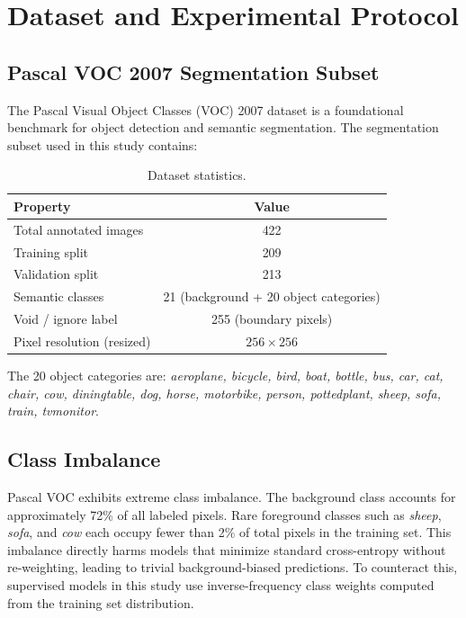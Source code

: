 \documentclass[11pt,a4paper]{article}
\begin{document}
\section{Dataset and Experimental Protocol}

\subsection{Pascal VOC 2007 Segmentation Subset}

The Pascal Visual Object Classes (VOC) 2007 dataset is a foundational benchmark for object detection and semantic segmentation. The segmentation subset used in this study contains:

\begin{table}[H]
\centering
\caption{Dataset statistics.}
\begin{tabular}{lc}
\toprule
Property & Value \\
\midrule
Total annotated images & 422 \\
Training split & 209 \\
Validation split & 213 \\
Semantic classes & 21 (background + 20 object categories) \\
Void / ignore label & 255 (boundary pixels) \\
Pixel resolution (resized) & $256 \times 256$ \\
\bottomrule
\end{tabular}
\end{table}

The 20 object categories are: \textit{aeroplane, bicycle, bird, boat, bottle, bus, car, cat, chair, cow, diningtable, dog, horse, motorbike, person, pottedplant, sheep, sofa, train, tvmonitor}.

\subsection{Class Imbalance}

Pascal VOC exhibits extreme class imbalance. The background class accounts for approximately 72\% of all labeled pixels. Rare foreground classes such as \textit{sheep}, \textit{sofa}, and \textit{cow} each occupy fewer than 2\% of total pixels in the training set. This imbalance directly harms models that minimize standard cross-entropy without re-weighting, leading to trivial background-biased predictions. To counteract this, supervised models in this study use inverse-frequency class weights computed from the training set distribution.
\end{document}
